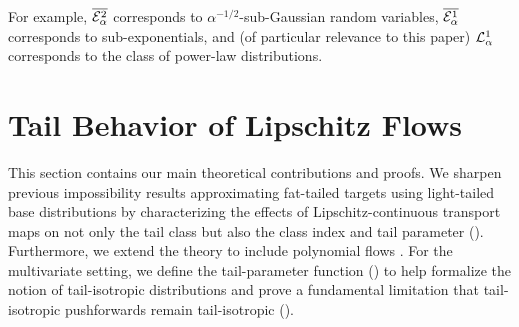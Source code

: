 \documentclass[../../thesis.tex]{subfiles}
\begin{document}

For example, $\overline{\mathcal{E}_\alpha^2}$ corresponds to $\alpha^{-1/2}$-sub-Gaussian random variables,
$\overline{\mathcal{E}_\alpha^1}$ corresponds to sub-exponentials, and (of particular relevance to this paper) $\mathcal{L}^1_\alpha$ corresponds to the class of power-law distributions.

\section{Tail Behavior of Lipschitz Flows}

This section contains our main theoretical contributions and proofs.
We sharpen previous impossibility results approximating fat-tailed targets
using light-tailed base distributions \citep[Theorem 4]{jaini2020tails}
by characterizing the effects of Lipschitz-continuous transport maps on not only the tail class
but also the class index and tail parameter (). Furthermore, we extend the theory
to include polynomial flows \citep{jaini2019sum}. For the multivariate setting,
we define the tail-parameter function () to help formalize the notion
of tail-isotropic distributions and prove a fundamental limitation that tail-isotropic
pushforwards remain tail-isotropic ().
\end{document}
